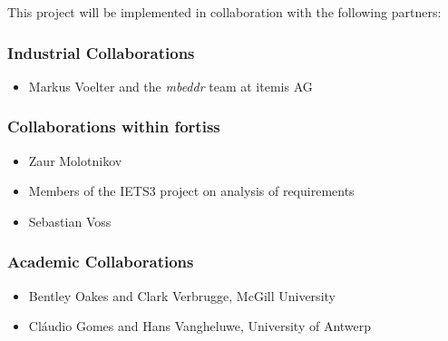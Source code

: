This project will be implemented in collaboration with the following partners:

\subsubsection{Industrial Collaborations}
\begin{itemize}
  \item Markus Voelter and the \emph{mbeddr} team at itemis AG
\end{itemize}

\subsubsection{Collaborations within fortiss}
\begin{itemize}
  \item Zaur Molotnikov
  \item Members of the IETS3 project on analysis of requirements
  \item Sebastian Voss
\end{itemize}

\subsubsection{Academic Collaborations}
\begin{itemize}
  \item Bentley Oakes and Clark Verbrugge, McGill University
  \item Cl\'audio Gomes and Hans Vangheluwe, University of Antwerp
\end{itemize}